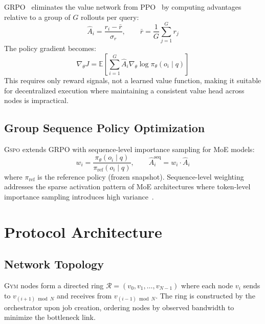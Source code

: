 \documentclass[11pt,letterpaper]{article}
\newcommand{\GYM}{\textsc{Gym}}
\newcommand{\GSPO}{\textsc{Gspo}}
\begin{document}
GRPO~\cite{shao2024deepseekmath} eliminates the value network from PPO~\cite{schulman2017proximal} by computing advantages relative to a group of $G$ rollouts per query:
\begin{equation}
    \hat{A}_i = \frac{r_i - \bar{r}}{\sigma_r}, \qquad \bar{r} = \frac{1}{G}\sum_{j=1}^G r_j
    \label{eq:grpo-advantage}
\end{equation}
The policy gradient becomes:
\begin{equation}
    \nabla_\theta J = \mathbb{E}\left[\sum_{i=1}^G \hat{A}_i \nabla_\theta \log \pi_\theta(o_i \mid q)\right]
    \label{eq:grpo-policy}
\end{equation}
This requires only reward signals, not a learned value function, making it suitable for decentralized execution where maintaining a consistent value head across nodes is impractical.

\subsection{Group Sequence Policy Optimization}

\GSPO{} extends GRPO with sequence-level importance sampling for MoE models:
\begin{equation}
    w_i = \frac{\pi_\theta(o_i \mid q)}{\pi_{\text{ref}}(o_i \mid q)}, \qquad \hat{A}_i^{\text{seq}} = w_i \cdot \hat{A}_i
    \label{eq:gspo}
\end{equation}
where $\pi_{\text{ref}}$ is the reference policy (frozen snapshot).  Sequence-level weighting addresses the sparse activation pattern of MoE architectures where token-level importance sampling introduces high variance~\cite{shazeer2017outrageously}.

\section{Protocol Architecture}
\label{sec:architecture}

\subsection{Network Topology}

\GYM{} nodes form a directed ring $\mathcal{R} = (v_0, v_1, \ldots, v_{N-1})$ where each node $v_i$ sends to $v_{(i+1) \bmod N}$ and receives from $v_{(i-1) \bmod N}$.  The ring is constructed by the orchestrator upon job creation, ordering nodes by observed bandwidth to minimize the bottleneck link.
\end{document}
